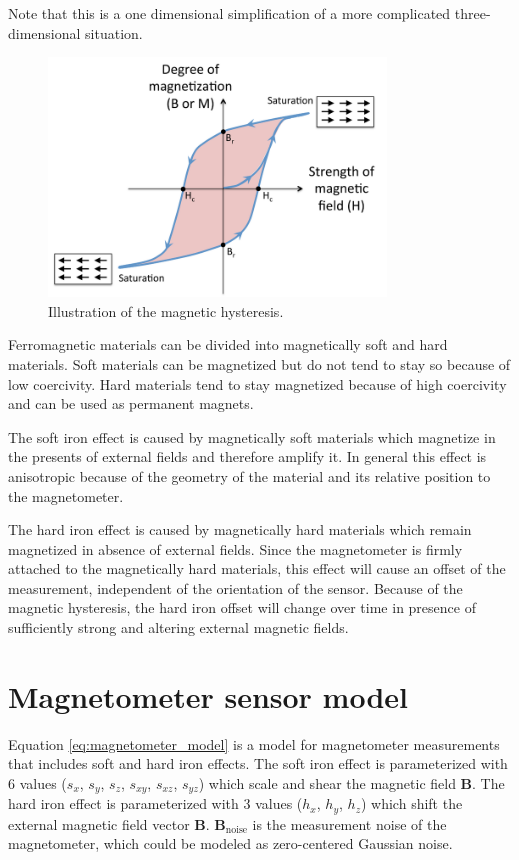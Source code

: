 Note that this is a one dimensional simplification of a more complicated three-dimensional situation.

\begin{figure}[hbt!]
    \centering
    \includegraphics[width=0.8\textwidth]{figures/magnetic_hysteresis.png}
    \caption{Illustration of the magnetic hysteresis.}
    \label{fig:magnetic_hysteresis}
\end{figure}

Ferromagnetic materials can be divided into magnetically soft and hard materials. Soft materials can be magnetized but do not tend to stay so because of low coercivity. Hard materials tend to stay magnetized because of high coercivity and can be used as permanent magnets.

The soft iron effect is caused by magnetically soft materials which magnetize in the presents of external fields and therefore amplify it. In general this effect is anisotropic because of the geometry of the material and its relative position to the magnetometer.

The hard iron effect is caused by magnetically hard materials which remain magnetized in absence of external fields. Since the magnetometer is firmly attached to the magnetically hard materials, this effect will cause an offset of the measurement, independent of the orientation of the sensor. Because of the magnetic hysteresis, the hard iron offset will change over time in presence of sufficiently strong and altering external magnetic fields.

\section{Magnetometer sensor model}

Equation \ref{eq:magnetometer_model} is a model for magnetometer measurements that includes soft and hard iron effects. The soft iron effect is parameterized with 6 values ($s_x$, $s_y$, $s_z$, $s_{xy}$, $s_{xz}$, $s_{yz}$) which scale and shear the magnetic field $\bm{B}$. The hard iron effect is parameterized with 3 values ($h_x$, $h_y$, $h_z$) which shift the external magnetic field vector $\bm{B}$. $\bm{B}_\text{noise}$ is the measurement noise of the magnetometer, which could be modeled as zero-centered Gaussian noise.\cite{vectornav}

